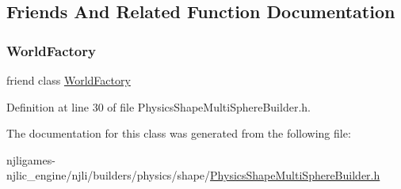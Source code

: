 \subsection{Friends And Related Function Documentation}
\mbox{\label{classnjli_1_1_physics_shape_multi_sphere_builder_acb96ebb09abe8f2a37a915a842babfac}} 
\subsubsection{\texorpdfstring{World\+Factory}{WorldFactory}}
{\footnotesize\ttfamily friend class \mbox{\hyperlink{classnjli_1_1_world_factory}{World\+Factory}}\hspace{0.3cm}{\ttfamily [friend]}}



Definition at line 30 of file Physics\+Shape\+Multi\+Sphere\+Builder.\+h.



The documentation for this class was generated from the following file\+:\begin{DoxyCompactItemize}
\item 
njligames-\/njlic\+\_\+engine/njli/builders/physics/shape/\mbox{\hyperlink{_physics_shape_multi_sphere_builder_8h}{Physics\+Shape\+Multi\+Sphere\+Builder.\+h}}\end{DoxyCompactItemize}
